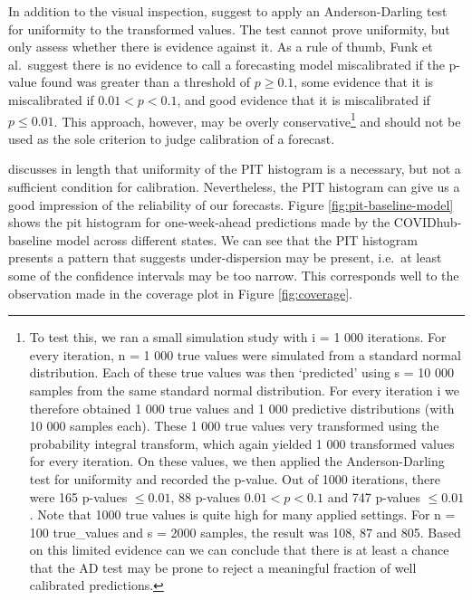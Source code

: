 \documentclass[
]{book}
\begin{document}
In addition to the visual inspection, \citet{funkAssessingPerformanceRealtime2019} suggest to apply an Anderson-Darling \citep{andersonAsymptoticTheoryCertain1952} test for uniformity to the transformed values. The test cannot prove uniformity, but only assess whether there is evidence against it. As a rule of thumb, Funk et al.~suggest there is no evidence to call a forecasting model miscalibrated if the p-value found was greater than a threshold of \(p \geq 0.1\), some evidence that it is miscalibrated if \(0.01 < p < 0.1\), and good evidence that it is miscalibrated if \(p \leq 0.01\). This approach, however, may be overly conservative\footnote{To test this, we ran a small simulation study with i = 1 000 iterations. For every iteration, n = 1 000 true values were simulated from a standard normal distribution. Each of these true values was then `predicted' using s = 10 000 samples from the same standard normal distribution. For every iteration i we therefore obtained 1 000 true values and 1 000 predictive distributions (with 10 000 samples each). These 1 000 true values very transformed using the probability integral transform, which again yielded 1 000 transformed values for every iteration. On these values, we then applied the Anderson-Darling test for uniformity and recorded the p-value. Out of 1000 iterations, there were 165 p-values \(\leq 0.01\), 88 p-values \(0.01 < p < 0.1\) and 747 p-values \(\leq 0.01\). Note that 1000 true values is quite high for many applied settings. For n = 100 true\_values and s = 2000 samples, the result was 108, 87 and 805. Based on this limited evidence can we can conclude that there is at least a chance that the AD test may be prone to reject a meaningful fraction of well calibrated predictions.} and should not be used as the sole criterion to judge calibration of a forecast.

\citet{hamillInterpretationRankHistograms2001} discusses in length that uniformity of the PIT histogram is a necessary, but not a sufficient condition for calibration. Nevertheless, the PIT histogram can give us a good impression of the reliability of our forecasts. Figure \ref{fig:pit-baseline-model} shows the pit histogram for one-week-ahead predictions made by the COVIDhub-baseline model across different states. We can see that the PIT histogram presents a pattern that suggests under-dispersion may be present, i.e.~at least some of the confidence intervals may be too narrow. This corresponds well to the observation made in the coverage plot in Figure \ref{fig:coverage}.
\end{document}
